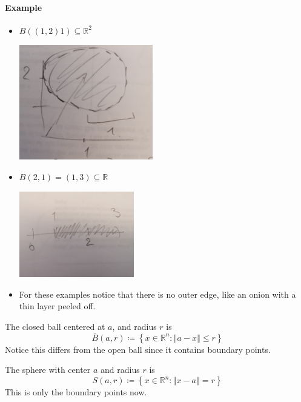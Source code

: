 \documentclass[11pt]{book}
\begin{document}
\paragraph{Example} 
\begin{itemize}
    \item $B\left(\left( 1,2 \right) 1\right) \subseteq \mathbb{R} ^2 $ 
    \begin{center}
        \includegraphics[height=50mm]{assets/lec3_ball-ex.jpg} 
    \end{center}
    \item $B\left(2, 1\right) = \left( 1,3 \right)\subseteq \mathbb{R}  $ 
        \begin{center}
            \includegraphics[width=50mm]{assets/lec3_ball-1d.jpg} 
        \end{center}
    \item For these examples notice that there is no outer edge, like an onion with a thin layer peeled off.
\end{itemize}

\newpage

\begin{defn}\label{defn:closed_ball}
    The closed ball centered at $a$,  and radius $r$ is 
    \[
    \bar{B} \left(a, r\right) \coloneqq \left\{ x\in \mathbb{R} ^{n} : \left\Vert a - x \right\Vert \le r \right\} 
    \]
    Notice this differs from the open ball since it contains boundary points.
\end{defn}

\begin{defn}[Sphere]\label{defn:sphere}
    The sphere with center $a$ and radius $r$ is 
    \[
    S\left(a, r\right) \coloneqq \left\{ x\in \mathbb{R} ^{n} : \left\Vert x - a \right\Vert = r \right\} 
    \]
    This is only the boundary points now.
\end{defn}
\end{document}
